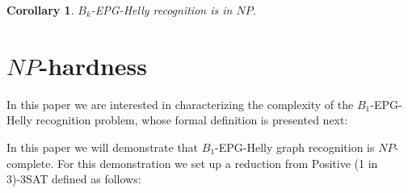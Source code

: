 \documentclass[a4paper,11pt]{article}
\newtheorem{coro}[theorem]{Corollary}
\begin{document}


\begin{coro}
{\sc $B_k$-EPG-Helly  recognition} is in $NP$.
\end{coro}
 



\section{$NP$-hardness}\label{sec:sectionDispositivoClausula}

In this paper we are interested in characterizing the complexity of the $B_1$-EPG-Helly recognition problem, whose formal definition is presented next:



In this paper we will demonstrate that  $B_1$-EPG-Helly graph recognition is $NP$-complete. For this demonstration we set up a reduction from {\sc Positive (1 in 3)-3SAT} defined  as follows:





\end{document}
